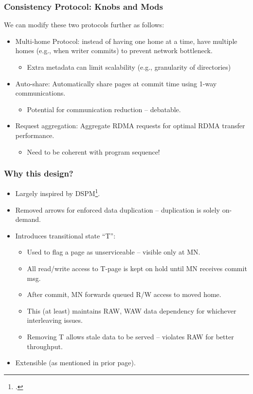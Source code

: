 \documentclass{beamer}
\begin{document}
\begin{frame}
    \frametitle{Consistency Protocol: Knobs and Mods}
    We can modify these two protocols further as follows:
    \begin{itemize}
        \item {
            Multi-home Protocol: instead of having one home at a time, have
            multiple homes (e.g., when writer commits) to prevent network bottleneck.
            \begin{itemize}
                \item Extra metadata can limit scalability (e.g., granularity of directories)
            \end{itemize}
        }
        \item {
            Auto-share: Automatically share pages at commit time using 1-way
            communications.
            \begin{itemize}
                \item Potential for communication reduction -- debatable.
            \end{itemize}
        }
        \item {
            Request aggregation: Aggregate RDMA requests for optimal RDMA transfer performance.
            \begin{itemize}
                \item Need to be coherent with program sequence!
            \end{itemize}
        }
    \end{itemize}
\end{frame}

\begin{frame}
    \frametitle{Why this design?}
    \begin{itemize}
        \item Largely inspired by DSPM\footcite{shan2017distributed}.
        \item Removed arrows for enforced data duplication -- duplication is solely on-demand.
        \item {
            Introduces transitional state ``T'':
            \begin{itemize}
                \item Used to flag a page as unserviceable -- visible only at MN.
                \item All read/write access to T-page is kept on hold until MN receives commit msg.
                \item After commit, MN forwards queued R/W access to moved home.
                \item This (at least) maintains RAW, WAW data dependency for whichever interleaving issues.
                \item Removing T allows stale data to be served -- violates RAW for better throughput.
            \end{itemize}
        }
        \item Extensible (as mentioned in prior page).
    \end{itemize}
\end{frame}
\end{document}

